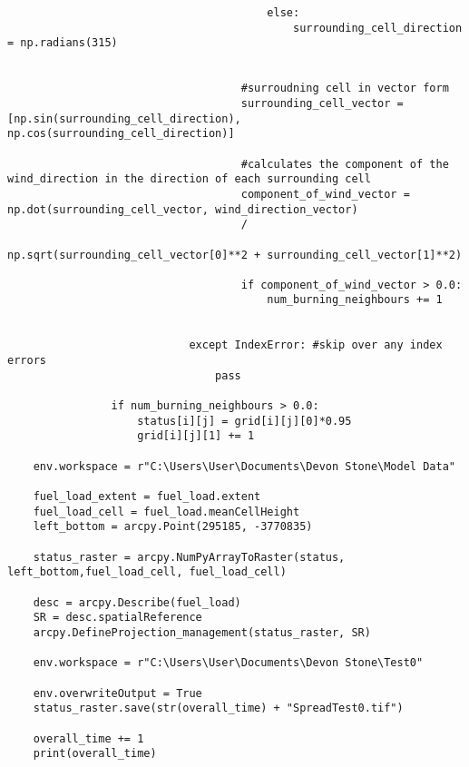 \begin{lstlisting}
                                        else:
                                            surrounding_cell_direction = np.radians(315)
                                            

                                    #surroudning cell in vector form
                                    surrounding_cell_vector = [np.sin(surrounding_cell_direction), np.cos(surrounding_cell_direction)]
                                    
                                    #calculates the component of the wind_direction in the direction of each surrounding cell
                                    component_of_wind_vector = np.dot(surrounding_cell_vector, wind_direction_vector)
                                    /
                                    np.sqrt(surrounding_cell_vector[0]**2 + surrounding_cell_vector[1]**2)

                                    if component_of_wind_vector > 0.0:
                                        num_burning_neighbours += 1

                                
                            except IndexError: #skip over any index errors 
                                pass

                if num_burning_neighbours > 0.0:
                    status[i][j] = grid[i][j][0]*0.95
                    grid[i][j][1] += 1

    env.workspace = r"C:\Users\User\Documents\Devon Stone\Model Data"

    fuel_load_extent = fuel_load.extent
    fuel_load_cell = fuel_load.meanCellHeight
    left_bottom = arcpy.Point(295185, -3770835)

    status_raster = arcpy.NumPyArrayToRaster(status, left_bottom,fuel_load_cell, fuel_load_cell)

    desc = arcpy.Describe(fuel_load)
    SR = desc.spatialReference
    arcpy.DefineProjection_management(status_raster, SR)
    
    env.workspace = r"C:\Users\User\Documents\Devon Stone\Test0"

    env.overwriteOutput = True
    status_raster.save(str(overall_time) + "SpreadTest0.tif")

    overall_time += 1
    print(overall_time)
   
                            




\end{lstlisting}